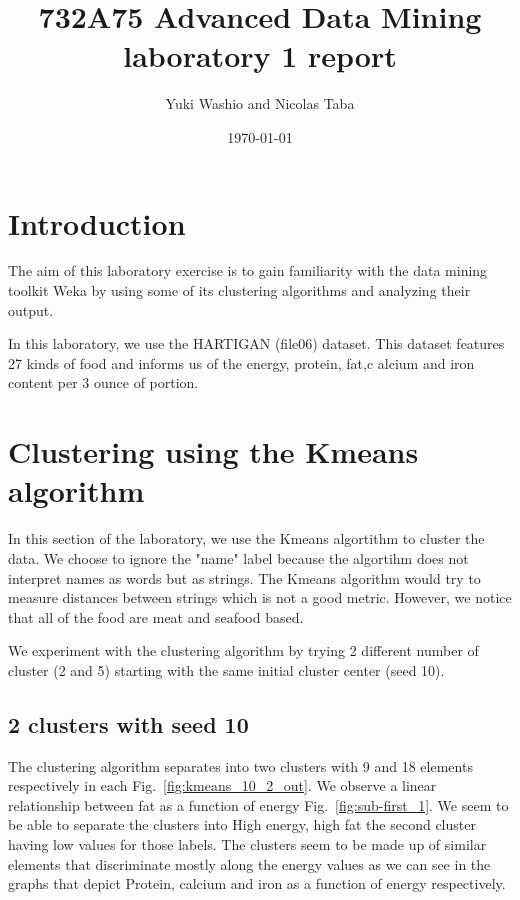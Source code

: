\documentclass[letterpaper,12pt]{article}
\begin{document}
\title{732A75 Advanced Data Mining laboratory 1 report}
\author{Yuki Washio and Nicolas Taba}
\date{\today}
\maketitle



\section{Introduction}

The aim of this laboratory exercise is to gain familiarity with the data mining toolkit Weka by using some of its clustering algorithms and analyzing their output.

In this laboratory, we use the HARTIGAN (file06) dataset. This dataset features 27 kinds of food and informs us of the energy, protein, fat,c alcium and iron content per 3 ounce of portion.


\section{Clustering using the Kmeans algorithm}

In this section of the laboratory, we use the Kmeans algortithm to cluster the data. We choose to ignore the "name" label because the algortihm does not interpret names as words but as strings. The Kmeans algorithm would try to measure distances between strings which is not a good metric. However, we notice that all of the food are meat and seafood based.

We experiment with the clustering algorithm by trying 2 different number of cluster (2 and 5) starting with the same initial cluster center (seed 10).

\subsection{2 clusters with seed 10}



The clustering algorithm separates into two clusters with 9 and 18 elements respectively in each Fig.~\ref{fig:kmeans_10_2_out}. We observe a linear relationship between fat as a function of energy Fig.~\ref{fig:sub-first_1}. We seem to be able to separate the clusters into High energy, high fat the second cluster having low values for those labels. The clusters seem to be made up of similar elements that discriminate mostly along the energy values as we can see in the graphs that depict Protein, calcium and iron as a function of energy respectively.
\end{document}
